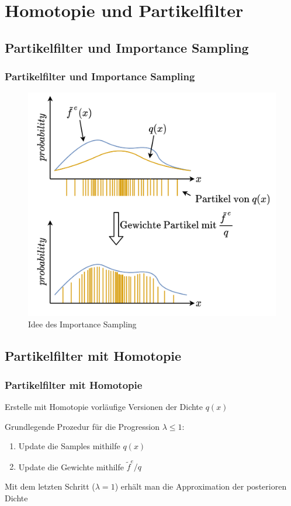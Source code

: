 \documentclass[18pt]{beamer}
\begin{document}
\section{Homotopie und Partikelfilter}

\subsection{Partikelfilter und Importance Sampling}
\begin{frame}
    \frametitle{Partikelfilter und Importance Sampling}
    \begin{figure}[]
        \centering
        \includegraphics[scale=0.18]{pictures/particlefilter.png}
        \caption{Idee des Importance Sampling}
    \end{figure}

\end{frame}

\subsection{Partikelfilter mit Homotopie}
\begin{frame}
    \frametitle{Partikelfilter mit Homotopie}
    Erstelle mit Homotopie vorläufige Versionen der Dichte $q(x)$

    \vspace{15pt}
    Grundlegende Prozedur für die Progression $\lambda \leq 1$:
    \begin{enumerate}
        \item Update die Samples mithilfe $q(x)$
        \item Update die Gewichte mithilfe $\tilde{f}^{e}/q$
    \end{enumerate}
    \vspace{15pt}
    Mit dem letzten Schritt ($\lambda = 1$) erhält man die Approximation der posterioren Dichte
\end{frame}
\end{document}
